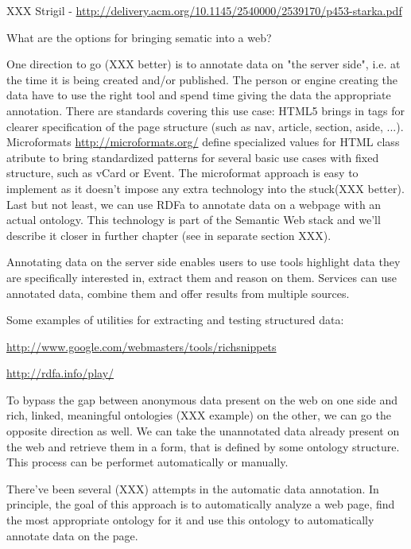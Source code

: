 XXX Strigil - \url{http://delivery.acm.org/10.1145/2540000/2539170/p453-starka.pdf}

What are the options for bringing sematic into a web? 


One direction to go (XXX better) is to annotate data on "the server side", i.e. at the time
it is being created and/or published. The person or engine creating the data have to use
the right tool and spend time giving the data the appropriate annotation. There
are standards covering this use case: HTML5 brings in tags for clearer
specification of the page structure (such as nav, article, section, aside,
...). Microformats \url{http://microformats.org/} define specialized values for
HTML class atribute to bring standardized patterns for several basic use cases
with fixed structure, such as vCard or Event. The microformat approach is easy
to implement as it doesn't impose any extra technology into the stuck(XXX
better). Last but not least, we can use RDFa to annotate data on a webpage with an
actual ontology. This technology is part of the Semantic Web stack and we'll
describe it closer in further chapter (see in separate section XXX).

Annotating data on the server side enables users to use tools highlight data
they are specifically interested in, extract them and reason on them. Services
can use annotated data, combine them and offer results from multiple sources. 

Some examples of utilities for extracting and testing structured data: 

\url{http://www.google.com/webmasters/tools/richsnippets}

\url{http://rdfa.info/play/}

To bypass the gap between anonymous data present on the web on one side and
rich, linked, meaningful ontologies (XXX example) on the other, we can go the
opposite direction as well. We can take the unannotated data already present on
the web and retrieve them in a form, that is defined by some ontology
structure. This process can be performet automatically or manually. 

There've been several (XXX) attempts in the automatic data annotation. In
principle, the goal of this approach is to automatically analyze a web page,
find the most appropriate ontology for it and use this ontology to
automatically annotate data on the page. 

